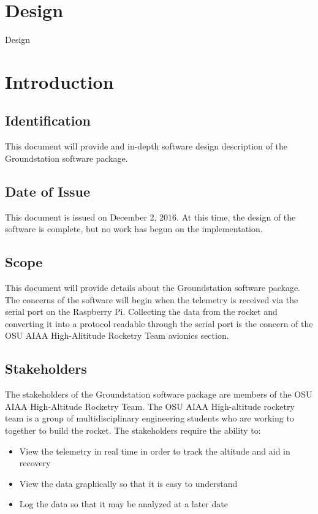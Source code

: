 \documentclass[10pt,draftclsnofoot,onecolumn]{IEEEtran}
\begin{document}
\newpage


	\section{Design}
	\begin{center}
		\huge
		Design\\
	\end{center}
	
	
	


	\section{Introduction}

	\subsection{Identification}
	This document will provide and in-depth software design description of the Groundstation software package.
	
	\subsection{Date of Issue}
	This document is issued on December 2, 2016.
	At this time, the design of the software is complete, but no work has begun on the implementation.
	
	\subsection{Scope}
	This document will provide details about the Groundstation software package.
	The concerns of the software will begin when the telemetry is received via the serial port on the Raspberry Pi.
	Collecting the data from the rocket and converting it into a protocol readable through the serial port is the
	concern of the \ac{OSU} \ac{AIAA} High-Alititude Rocketry Team avionics section.
		
	\subsection{Stakeholders}
	The stakeholders of the Groundstation software package are members of the \ac{OSU} \ac{AIAA} High-Altitude Rocketry Team.
	The \ac{OSU} \ac{AIAA} High-altitude rocketry team is a group of multidisciplinary engineering students who are working to together to build the rocket.
	The stakeholders require the ability to:
	\begin{itemize}
		\item View the telemetry in real time in order to track the altitude and aid in recovery
		\item View the data graphically so that it is easy to understand
		\item Log the data so that it may be analyzed at a later date
	\end{itemize}
\end{document}

